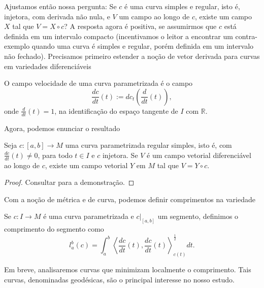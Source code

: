 Ajustamos então nossa pergunta: Se $c$ é uma curva simples e regular, isto é, injetora, com derivada não nula, e $V$ um campo ao longo de $c$, existe um campo $X$ tal que $V=X \circ c$? A resposta agora é positiva, se assumirmos que $c$ está definida em um intervalo compacto (incentivamos o leitor a encontrar um contra-exemplo quando uma curva é simples e regular, porém definida em um intervalo não fechado). Precisamos primeiro estender a noção de vetor derivada para curvas em variedades diferenciáveis
\begin{definition}
	\label{def:campo-velocidade}
	O campo velocidade de uma curva parametrizada é o campo
	\begin{equation*}
		\frac{dc}{dt}(t) :=dc_{t}\left( \frac{d}{dt}(t) \right),
	\end{equation*}
	onde $\frac{d}{dt}(t)=1$, na identificação do espaço tangente de $I$ com $\mathbb{R}$.
\end{definition}
Agora, podemos enunciar o resultado
\begin{theorem}
	\label{teo:extensao-campo-ao-longo-de-curva}
	Seja $c:[a,b]\to M$ uma curva parametrizada regular simples, isto é, com $\frac{dc}{dt}(t)\neq0$, para todo $t \in I$ e $c$  injetora. Se $V$ é um campo vetorial diferenciável ao longo de $c$, existe um campo vetorial $Y$ em $M$ tal que $V=Y \circ c$.
	\begin{proof}
		Consultar \textcite{leeRiemannian} para a demonstração. %
	\end{proof}
\end{theorem}
Com a noção de métrica e de curva, podemos definir comprimentos na variedade
\begin{definition}
	\label{def:comprimento-de-curva}
	Se $c:I\to M$ é uma curva parametrizada e $c|_{[a,b]}$ um segmento, definimos o comprimento do segmento como
	\begin{equation*}
		l_{a}^{b}(c)=\int_{a}^{b}\left<\frac{dc}{dt}(t),\frac{dc}{dt}(t)\right>_{c(t)}^{\frac{1}{2}}dt.
	\end{equation*}
\end{definition}
Em breve, analisaremos curvas que minimizam localmente o comprimento. Tais curvas, denominadas geodésicas, são o principal interesse no nosso estudo.

